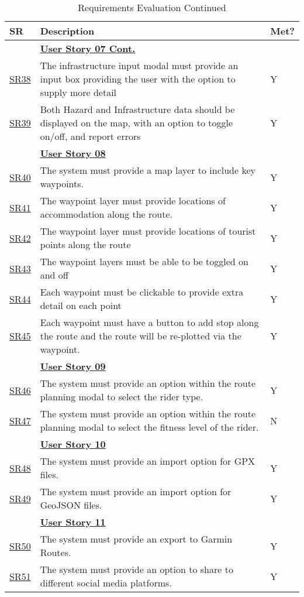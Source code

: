 \begin{table}[!htb]
    \ContinuedFloat
    \caption{Requirements Evaluation Continued}
    \label{evaluatedrqextended2}
    \small
    \begin{tabularx}{\textwidth}{ p{1cm} p{11cm} p{1cm} }
        \hline
        SR & Description & Met? \\ 
        \hline
        & \textbf{\hyperref[tab:user-story-07]{User Story 07 Cont.}}  \\
        \hyperref[SR:38]{SR38} & The infrastructure input modal must provide an input box providing the user with the option to supply more detail & Y\\
        \hyperref[SR:39]{SR39} & Both Hazard and Infrastructure data should be displayed on the map, with an option to toggle on/off, and report errors & Y\\
        \hline
        & \textbf{\hyperref[tab:user-story-08]{User Story 08}}  \\
        \hyperref[SR:40]{SR40} & The system must provide a map layer to include key waypoints. & Y \\
        \hyperref[SR:41]{SR41} & The waypoint layer must provide locations of accommodation along the route. & Y\\
        \hyperref[SR:42]{SR42} & The waypoint layer must provide locations of tourist points along the route & Y\\
        \hyperref[SR:43]{SR43} & The waypoint layers must be able to be toggled on and off & Y\\
        \hyperref[SR:44]{SR44} & Each waypoint must be clickable to provide extra detail on each point & Y\\
        \hyperref[SR:45]{SR45} & Each waypoint must have a button to add stop along the route and the route will be re-plotted via the waypoint. & Y\\
        \hline
        & \textbf{\hyperref[tab:user-story-09]{User Story 09}}  \\
        \hyperref[SR:46]{SR46} & The system must provide an option within the route planning modal to select the rider type. & Y\\
        \hyperref[SR:47]{SR47} & The system must provide an option within the route planning modal to select the fitness level of the rider. & N\\
        \hline
        & \textbf{\hyperref[tab:user-story-10]{User Story 10}}  \\
        \hyperref[SR:48]{SR48} & The system must provide an import option for GPX files. & Y\\
        \hyperref[SR:49]{SR49} & The system must provide an import option for GeoJSON files. & Y\\
        \hline
        & \textbf{\hyperref[tab:user-story-11]{User Story 11}} \\
        \hyperref[SR:50]{SR50} & The system must provide an export to Garmin Routes. & Y\\
        \hyperref[SR:51]{SR51} & The system must provide an option to share to different social media platforms. & Y\\
        \hline
    \end{tabularx}
\end{table}
\endgroup


